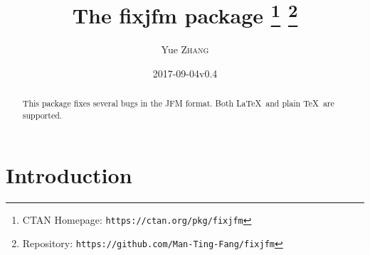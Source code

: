 \documentclass[a4paper]{article}
\newcommand\NormalSans{\normalfont\sffamily}
\newcommand\pkg[1]{{\protect\NormalSans#1}}
\begin{document}
\title{The \pkg{fixjfm} package%
  \thanks{CTAN Homepage: \texttt{https://ctan.org/pkg/fixjfm}}
  \thanks{Repository: \texttt{https://github.com/Man-Ting-Fang/fixjfm}}}
\author{Yue \textsc{Zhang}}
\date{2017-09-04\quad v0.4}

\maketitle

\begin{abstract}
This package fixes several bugs in the JFM format. Both \LaTeX\ and plain \TeX\
are supported.
\end{abstract}

\section{Introduction}
\end{document}
